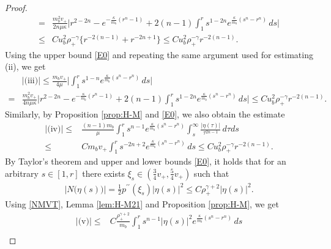 \documentclass[a4paper,12pt,draft]{article}
\theoremstyle{remark}
\begin{document}
\begin{proof}
\begin{align*}
        =&  \frac{m_b^2 v_{+}}{2n\mu\kappa} \bigg| r^{2-2n} - e^{-\frac{\kappa}{m_b}(r^n-1)} + 2(n-1)\int_{1}^r s^{1-2n} e^{\frac{\kappa}{m_b} (s^n-r^n)}\, ds  \bigg| \\
        \le & C u_b^2 \rho_+^{-\gamma}   \{ r^{-2(n-1)} + r^{-2n+1} \} \le C u_b^2 \rho_+^{-\gamma} r^{-2(n-1)}.
    \end{align*}
    Using the upper bound \eqref{E0} and repeating the same argument used for estimating \textrm{(ii)}, we get
    \begin{align*}
        &|\textrm{(iii)}| \le \frac{m_b v_{+}}{4\mu} \bigg| \int_{1}^r s^{1-n} e^{\frac{\kappa}{m_b}(s^n-r^n)}\, ds \bigg|\\
        =& \frac{m_b^2 v_{+}}{4n\mu\kappa}  \bigg| r^{2-2n} - e^{-\frac{\kappa}{m_b}(r^n-1)} + 2(n-1)\int_{1}^r s^{1-2n} e^{\frac{\kappa}{m_b} (s^n-r^n)}\, ds  \bigg| \le C u_b^2 \rho_{+}^{-\gamma} r^{-2(n-1)}.
    \end{align*}
    Similarly, by Proposition \ref{prop:H-M} and \eqref{E0}, we also obtain the estimate
    \begin{align*}
        |\textrm{(iv)}| \le & \frac{(n-1)m_b}{\mu} \int_{1}^r s^{n-1} e^{\frac{\kappa}{m_b}(s^n-r^n)} \int_{s}^{\infty} \frac{|\eta(\tau)|}{\tau^{2n-1}} \, d\tau d s\\
        \le & C m_b v_{+} \int_{1}^r s^{-2n+2} e^{\frac{\kappa}{m_b}(s^n-r^n)} \,ds \le C u_b^2 \rho_{+}^{-\gamma}  r^{-2(n-1)}.
    \end{align*}
    By Taylor's theorem and upper and lower bounds \eqref{E0}, it holds that for an arbitrary $s\in [1,r]$ there exists $\xi_s\in (\frac{3}{4} v_{+}, \frac{5}{4}v_{+})$ such that 
    \begin{align}\label{NMVT}
        \big|N\big(\eta(s)\big)\big| = \frac{1}{2} p^{\prime\prime}(\xi_s) |\eta(s)|^2 \le C \rho_{+}^{\gamma+2} |\eta(s)|^2.
    \end{align}
    Using \eqref{NMVT}, Lemma \ref{lem:H-M21} and Proposition \ref{prop:H-M}, we get
    \begin{align*}
        |\textrm{(v)}| \le& C\frac{\rho_{+}^{\gamma+2}}{m_b}  \int_{1}^r s^{n-1} |\eta(s)|^2 e^{\frac{\kappa}{m_b}(s^n-r^n)}\, ds\\ 

\end{align*}
\end{proof}
\end{document}
